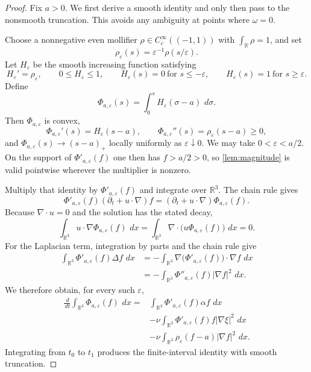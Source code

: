 \documentclass[10pt,a4paper]{amsart}
\newcommand{\R}{\mathbb R}\newcommand{\dd}{\,d}\newcommand{\HH}{\mathcal H}
\begin{document}
\begin{proof}
Fix $a>0$.  We first derive a smooth identity and only then pass to the
nonsmooth truncation.  This avoids any ambiguity at points where $\omega=0$.

Choose a nonnegative even mollifier $\rho\in C_c^\infty((-1,1))$ with
$\int_\R\rho=1$, and set
\[
\rho_\varepsilon(s)=\varepsilon^{-1}\rho(s/\varepsilon).
\]
Let $H_\varepsilon$ be the smooth increasing function satisfying
\[
H_\varepsilon'=\rho_\varepsilon,
\qquad
0\le H_\varepsilon\le1,
\qquad
H_\varepsilon(s)=0\ \text{for }s\le-\varepsilon,
\qquad
H_\varepsilon(s)=1\ \text{for }s\ge\varepsilon.
\]
Define
\[
\Phi_{a,\varepsilon}(s)=\int_0^sH_\varepsilon(\sigma-a)\,\dd\sigma.
\]
Then $\Phi_{a,\varepsilon}$ is convex,
\[
\Phi_{a,\varepsilon}'(s)=H_\varepsilon(s-a),
\qquad
\Phi_{a,\varepsilon}''(s)=\rho_\varepsilon(s-a)\ge0,
\]
and $\Phi_{a,\varepsilon}(s)\to(s-a)_+$ locally uniformly as
$\varepsilon\downarrow0$.  We may take $0<\varepsilon<a/2$.  On the support
of $\Phi'_{a,\varepsilon}(f)$ one then has $f>a/2>0$, so
\cref{lem:magnitude} is valid pointwise wherever the multiplier is nonzero.

Multiply that identity by $\Phi'_{a,\varepsilon}(f)$ and integrate over
$\R^3$.  The chain rule gives
\[
\Phi'_{a,\varepsilon}(f)(\partial_t+u\cdot\nabla)f
=(\partial_t+u\cdot\nabla)\Phi_{a,\varepsilon}(f).
\]
Because $\nabla\cdot u=0$ and the solution has the stated decay,
\[
\int_{\R^3}u\cdot\nabla\Phi_{a,\varepsilon}(f)\,\dd x
=\int_{\R^3}\nabla\cdot\bigl(u\Phi_{a,\varepsilon}(f)\bigr)\,\dd x=0.
\]
For the Laplacian term, integration by parts and the chain rule give
\[
\begin{aligned}
\int_{\R^3}\Phi'_{a,\varepsilon}(f)\Delta f\,\dd x
&=-\int_{\R^3}\nabla\bigl(\Phi'_{a,\varepsilon}(f)\bigr)\cdot\nabla f\,\dd x\\
&=-\int_{\R^3}\Phi''_{a,\varepsilon}(f)|\nabla f|^2\,\dd x.
\end{aligned}
\]
We therefore obtain, for every such $\varepsilon$,
\begin{equation}\label{eq:smooth-threshold}
\begin{aligned}
\frac{\dd}{\dd t}\int_{\R^3}\Phi_{a,\varepsilon}(f)\,\dd x
={}&\int_{\R^3}\Phi'_{a,\varepsilon}(f)\alpha f\,\dd x\\
&-\nu\int_{\R^3}\Phi'_{a,\varepsilon}(f)f|\nabla\xi|^2\,\dd x\\
&-\nu\int_{\R^3}\rho_\varepsilon(f-a)|\nabla f|^2\,\dd x.
\end{aligned}
\end{equation}
Integrating from $t_0$ to $t_1$ produces the finite-interval identity with
smooth truncation.


\end{proof}
\end{document}
